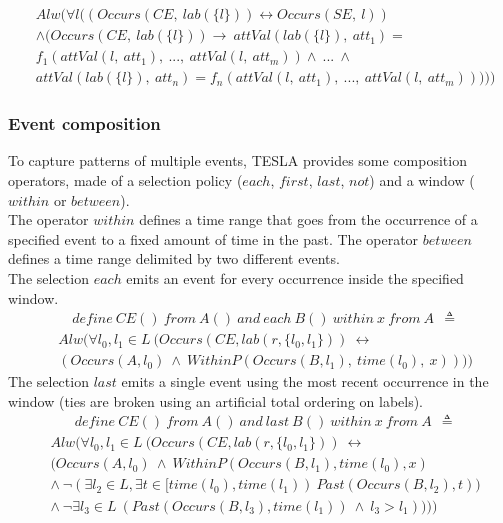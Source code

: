 \begin{align*}
&Alw(\forall l ((Occurs(CE,\ lab(\{l\})) \leftrightarrow Occurs(SE,\ l))\\
&\wedge (Occurs(CE,\ lab(\{l\})) \rightarrow\ attVal(lab(\{l\}),\ att_1) =\\
&f_1(attVal(l,\ att_1),\ ...,\ attVal(l,\ att_m)) \wedge\ ...\ \wedge\\
&attVal(lab(\{l\}),\ att_n) = f_n(attVal(l,\ att_1),\ ...,\ attVal(l,\ att_m)))))
\end{align*}

\subsubsection{Event composition}
To capture patterns of multiple events, TESLA provides some composition operators, made of a selection policy ($each$, $first$, $last$, $not$) and a window ($within$ or $between$).\\
The operator $within$ defines a time range that goes from the occurrence of a specified event to a fixed amount of time in the past. The operator $between$ defines a time range delimited by two different events.\\
The selection $each$ emits an event for every occurrence inside the specified window.
\begin{align*}
&define\ CE()\ from\ A()\ and\ each\ B()\ within\ x\ from\ A\ \ \triangleq
\end{align*}
\begin{align*}
&Alw(\forall l_0, l_1 \in L\ (Occurs(CE, lab(r, \{l_0, l_1\}))\ \leftrightarrow\\
&(Occurs(A, l_0)\ \wedge\ WithinP(Occurs(B, l_1),\ time(l_0),\ x))))
\end{align*}
The selection $last$ emits a single event using the most recent occurrence in the window (ties are broken using an artificial total ordering on labels).
\begin{align*}
&define\ CE()\ from\ A()\ and\ last\ B()\ within\ x\ from\ A\ \ \triangleq
\end{align*}
\begin{align*}
&Alw(\forall l_0, l_1 \in L\ (Occurs(CE, lab(r, \{l_0, l_1\}))\ \leftrightarrow\\
&(Occurs(A, l_0)\ \wedge\ WithinP(Occurs(B, l_1),time(l_0),x)\\
&\wedge\ \neg (\exists l_2 \in L, \exists t\in [time(l_0), time(l_1))\ Past(Occurs(B, l_2),t))\\
&\wedge\ \neg \exists l_3 \in L\ (Past(Occurs(B, l_3), time(l_1))\ \wedge\ l_3 > l_1)))) 
\end{align*}
